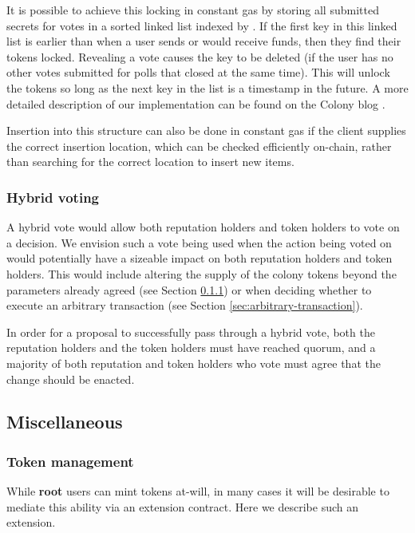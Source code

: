 It is possible to achieve this locking in constant gas by storing all submitted secrets for votes in a sorted linked list indexed by . If the first key in this linked list is earlier than  when a user sends or would receive funds, then they find their tokens locked. Revealing a vote causes the key to be deleted (if the user has no other votes submitted for polls that closed at the same time). This will unlock the tokens so long as the next key in the list is a timestamp in the future. A more detailed description of our implementation can be found on the Colony blog \cite{ColonyVoting}.

Insertion into this structure can also be done in constant gas if the client supplies the correct insertion location, which can be checked efficiently on-chain, rather than searching for the correct location to insert new items.

\subsubsection*{Hybrid voting}

A hybrid vote would allow both reputation holders and token holders to vote on a decision. We envision such a vote being used when the action being voted on would potentially have a sizeable impact on both reputation holders and token holders. This would include altering the supply of the colony tokens beyond the parameters already agreed (see Section \ref{sec:colony-token-management}) or when deciding whether to execute an arbitrary transaction (see Section \ref{sec:arbitrary-transaction}).

In order for a proposal to successfully pass through a hybrid vote, both the reputation holders and the token holders must have reached quorum, and a majority of both reputation and token holders who vote must agree that the change should be enacted.

\subsection{Miscellaneous}\label{sec:extensions-misc}

\subsubsection{Token management}\label{sec:colony-token-management}

While \textbf{root} users can mint tokens at-will, in many cases it will be desirable to mediate this ability via an extension contract. Here we describe such an extension.


